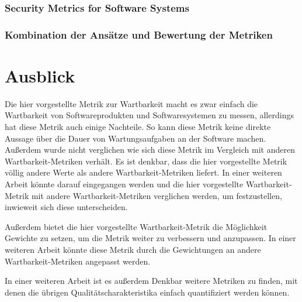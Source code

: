 \documentclass[12pt, a4paper, ngerman]{article}
\begin{document}
\subsubsection{Security Metrics for Software Systems~\cite{Wang_Wang_Guo_Xia_2009}}

\subsubsection{Kombination der Ansätze und Bewertung der Metriken}


\section{Ausblick}

Die hier vorgestellte Metrik zur Wartbarkeit macht es zwar einfach
die Wartbarkeit von Softwareprodukten und Softwaresystemen
zu messen, allerdings hat diese Metrik auch einige Nachteile.
So kann diese Metrik keine direkte Aussage über die Dauer 
von Wartungsaufgaben an der Software machen.
Außerdem wurde nicht verglichen wie sich diese Metrik 
im Vergleich mit anderen Wartbarkeit-Metriken verhält.
Es ist denkbar, dass die hier vorgestellte Metrik
völlig andere Werte als andere Wartbarkeit-Metriken liefert.
In einer weiteren Arbeit könnte darauf eingegangen werden
und die hier vorgestellte Wartbarkeit-Metrik
mit andere Wartbarkeit-Metriken verglichen werden,
um festzustellen, inwieweit sich diese unterscheiden.

Außerdem bietet die hier vorgestellte Wartbarkeit-Metrik 
die Möglichkeit Gewichte zu setzen, 
um die Metrik weiter zu verbessern und anzupassen.
In einer weiteren Arbeit könnte diese Metrik durch
die Gewichtungen an andere Wartbarkeit-Metriken angepasst werden.

In einer weiteren Arbeit ist es außerdem Denkbar weitere Metriken zu finden,
mit denen die übrigen Qualitätscharakteristika 
einfach quantifiziert werden können.



\newpage
\printbibliography
\end{document}
